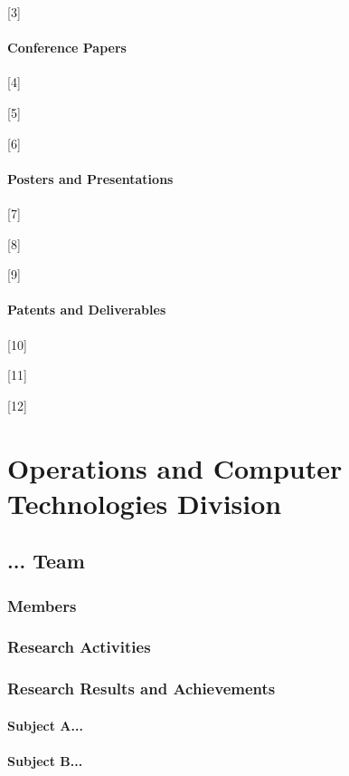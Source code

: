 \documentclass{book}
\begin{document}
[3]

\subsection{Conference Papers}

[4]

[5]

[6]

\subsection{Posters and Presentations}

[7]

[8]

[9]

\subsection{Patents and Deliverables}

[10]

[11]

[12]

\part{Operations and Computer Technologies Division}

\chapter{... Team}

\section{Members}

\section{Research Activities}

\section{Research Results and Achievements}

\subsection{Subject A...}

\subsection{Subject B...}
\end{document}
